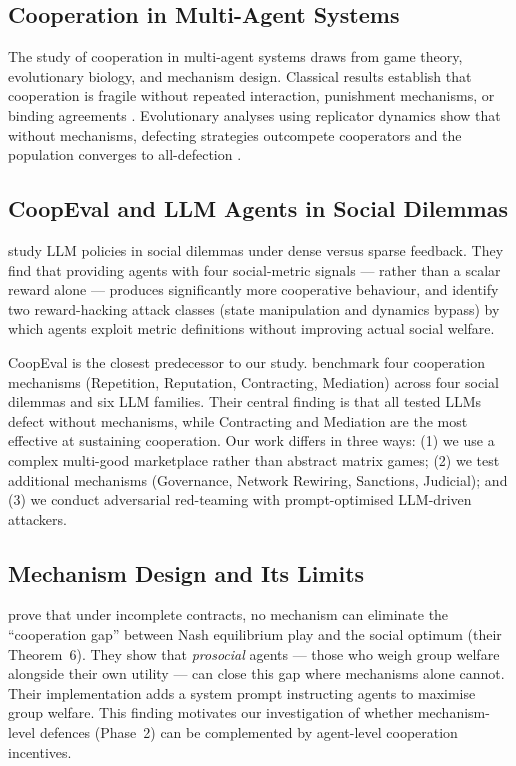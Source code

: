 \documentclass{article}
\begin{document}
\subsection{Cooperation in Multi-Agent Systems}

The study of cooperation in multi-agent systems draws from game theory, evolutionary biology, and mechanism design. Classical results establish that cooperation is fragile without repeated interaction, punishment mechanisms, or binding agreements \citep{axelrod1984}. Evolutionary analyses using replicator dynamics show that without mechanisms, defecting strategies outcompete cooperators and the population converges to all-defection \citep{coopeval}.

\subsection{CoopEval and LLM Agents in Social Dilemmas}

\citet{gallego2024} study LLM policies in social dilemmas under dense versus sparse feedback. They find that providing agents with four social-metric signals --- rather than a scalar reward alone --- produces significantly more cooperative behaviour, and identify two reward-hacking attack classes (state manipulation and dynamics bypass) by which agents exploit metric definitions without improving actual social welfare.

CoopEval is the closest predecessor to our study. \citet{coopeval} benchmark four cooperation mechanisms (Repetition, Reputation, Contracting, Mediation) across four social dilemmas and six LLM families. Their central finding is that all tested LLMs defect without mechanisms, while Contracting and Mediation are the most effective at sustaining cooperation. Our work differs in three ways: (1) we use a complex multi-good marketplace rather than abstract matrix games; (2) we test additional mechanisms (Governance, Network Rewiring, Sanctions, Judicial); and (3) we conduct adversarial red-teaming with prompt-optimised LLM-driven attackers.

\subsection{Mechanism Design and Its Limits}

\citet{huang2025} prove that under incomplete contracts, no mechanism can eliminate the ``cooperation gap'' between Nash equilibrium play and the social optimum (their Theorem~6). They show that \textit{prosocial} agents --- those who weigh group welfare alongside their own utility --- can close this gap where mechanisms alone cannot. Their implementation adds a system prompt instructing agents to maximise group welfare. This finding motivates our investigation of whether mechanism-level defences (Phase~2) can be complemented by agent-level cooperation incentives.
\end{document}
